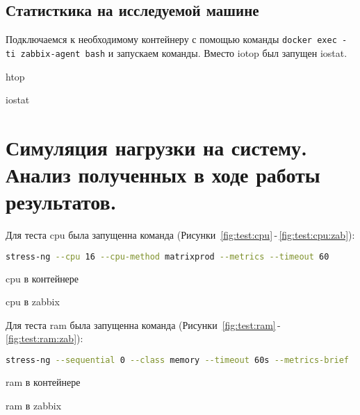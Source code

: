 \subsection{Статисткика на исследуемой машине}

Подключаемся к необходимому контейнеру с помощью команды
\texttt{docker exec -ti zabbix-agent bash} и запускаем команды.
Вместо iotop был запущен iostat.

\begin{image}
    \caption{htop}
    \label{fig:htop}
\end{image}

\begin{image}
    \caption{iostat}
    \label{fig:iostat}
\end{image}

\section{Симуляция нагрузки на систему.
Анализ полученных в ходе работы результатов.}

Для теста cpu была запущенна команда
(Рисунки~\ref{fig:test:cpu}\,-\,\ref{fig:test:cpu:zab}):
\begin{lstlisting}[language=bash]
stress-ng --cpu 16 --cpu-method matrixprod --metrics --timeout 60
\end{lstlisting}

\begin{image}
    \caption{cpu в контейнере}
    \label{fig:test:cpu}
\end{image}

\begin{image}
    \caption{cpu в zabbix}
    \label{fig:test:cpu:zab}
\end{image}


Для теста ram была запущенна команда
(Рисунки~\ref{fig:test:ram}\,-\,\ref{fig:test:ram:zab}):
\begin{lstlisting}[language=bash]
stress-ng --sequential 0 --class memory --timeout 60s --metrics-brief
\end{lstlisting}

\begin{image}
    \caption{ram в контейнере}
    \label{fig:test:ram}
\end{image}

\begin{image}
    \caption{ram в zabbix}
    \label{fig:test:ram:zab}
\end{image}

